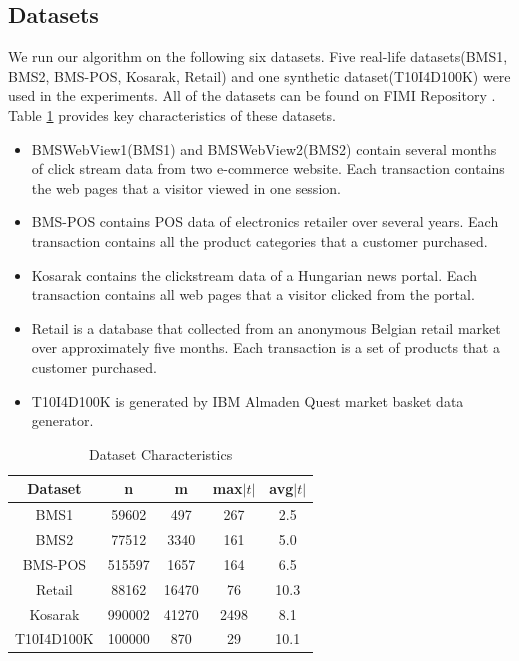 \documentclass[conference]{IEEEtran}
\begin{document}
\subsection{Datasets}
We run our algorithm on the following six datasets.
Five real-life datasets(BMS1, BMS2, BMS-POS, Kosarak, Retail) and one synthetic dataset(T10I4D100K) were used in the experiments.
All of the datasets can be found on FIMI Repository \cite{b12}.
Table \ref{dataset} provides key characteristics of these datasets.

\begin{itemize}
\item BMSWebView1(BMS1) and BMSWebView2(BMS2) contain several months of click stream data from two e-commerce website. Each transaction contains the web pages that a visitor viewed in one session. 
\item BMS-POS contains POS data of electronics retailer over several years. Each transaction contains all the product categories that a customer purchased.
\item Kosarak contains the clickstream data of a Hungarian news portal. Each transaction contains all web pages that a visitor clicked from the portal.
\item Retail is a database that collected from an anonymous Belgian retail market over approximately five months. Each transaction is a set of products that a customer purchased.
\item T10I4D100K is generated by IBM Almaden Quest market basket data generator.
\end{itemize}

\begin{table}[htbp]
    \caption{Dataset Characteristics}
    \centering    
    \begin{tabular}{|c|c|c|c|c|}
    \hline
    \textbf{Dataset}    & \textbf{n}      & \textbf{m}     & \textbf{max$|t|$} & \textbf{avg$|t|$} \\ \hline
    BMS1       & 59602  & 497   & 267    & 2.5    \\ \hline
    BMS2       & 77512  & 3340  & 161    & 5.0    \\ \hline
    BMS-POS    & 515597 & 1657  & 164    & 6.5    \\ \hline
    Retail     & 88162  & 16470 & 76     & 10.3   \\ \hline
    Kosarak    & 990002 & 41270 & 2498   & 8.1    \\ \hline
    T10I4D100K & 100000 & 870   & 29     & 10.1   \\ \hline
    \end{tabular}
    \label{dataset}
\end{table}
\end{document}
